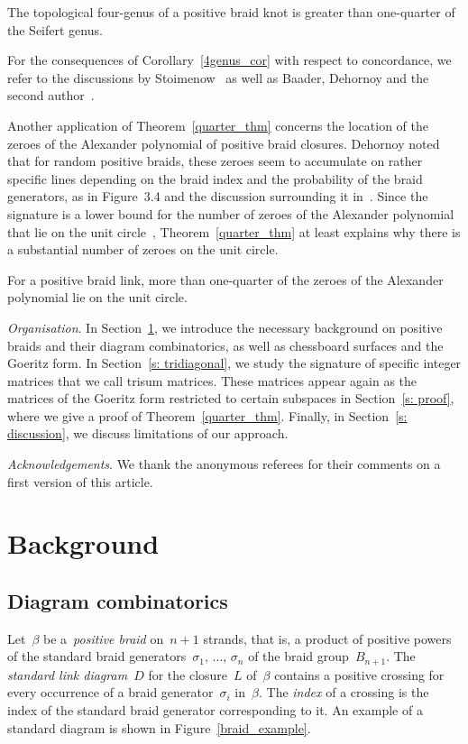 \documentclass[AHL,Unicode,longabstracts,published]{cedram}
\begin{document}
\begin{cor}\label{4genus_cor}
The topological four-genus of a positive braid knot is greater than one-quarter of the Seifert genus.
\end{cor}

For the consequences of Corollary~\ref{4genus_cor} with respect to concordance, we refer to the discussions by Stoimenow~\cite{Stoimenow} as well as Baader, Dehornoy and the second author~\cite{BDL}.
\smallskip

Another application of Theorem~\ref{quarter_thm} concerns the location of the zeroes of the Alexander polynomial of positive braid closures. Dehornoy noted that for random positive braids, these zeroes seem to accumulate on rather specific lines depending on the braid index and the probability of the braid generators, as in Figure~3.4 and the discussion surrounding it in~\cite{Dehornoy}. Since the signature is a lower bound for the number of zeroes of the Alexander polynomial that lie on the unit circle~\cite{GilmLiv, Lie16}, Theorem~\ref{quarter_thm} at least explains why there is a substantial number of zeroes on the unit circle.

\begin{cor}\label{Alex_cor}
For a positive braid link, more than one-quarter of the zeroes of the Alexander polynomial lie on the unit circle.
\end{cor}

\emph{Organisation}. In Section~\ref{s: background}, we introduce the necessary background on positive braids and their diagram combinatorics, as well as chessboard surfaces and the Goeritz form. In Section~\ref{s: tridiagonal}, we study the signature of specific integer matrices that we call trisum matrices. These matrices appear again as the matrices of the Goeritz form restricted to certain subspaces in Section~\ref{s: proof}, where we give a proof of Theorem~\ref{quarter_thm}. Finally, in Section~\ref{s: discussion}, we discuss limitations of our approach.
\medskip

\emph{Acknowledgements}. We thank the anonymous referees for their comments on a first version of this article.



\section{Background}\label{s: background}

\subsection{Diagram combinatorics}\label{ss diagrams}
Let~$\beta$ be a~\emph{positive braid} on~$n+1$ strands, that is, a product of positive powers of the standard braid generators~$\sigma_1,\,\dots,\,\sigma_n$ of the braid group~$B_{n+1}$. The \emph{standard link diagram}~$D$ for the closure~$L$ of~$\beta$ contains a positive crossing for every occurrence of a braid generator~$\sigma_i$ in~$\beta$. The \emph{index} of a crossing is the index of the standard braid generator corresponding to it. An example of a standard diagram is shown in Figure~\ref{braid_example}.
\end{document}
